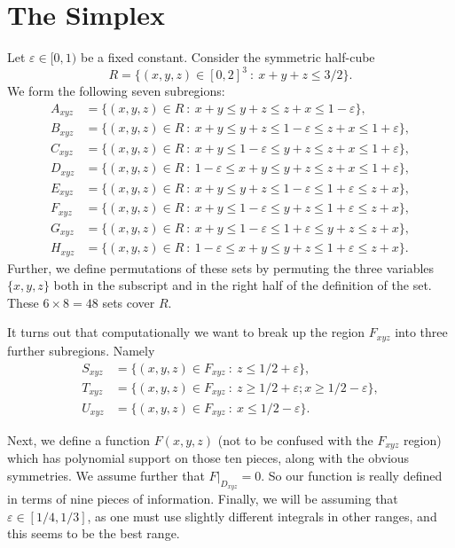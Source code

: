 \documentclass[12pt]{amsart}
\numberwithin{equation}{section}
\theoremstyle{plain}
\theoremstyle{definition}
\begin{document}
\section{The Simplex}

Let $\varepsilon\in [0,1)$ be a fixed constant.  Consider the symmetric half-cube
\[
R=\{(x,y,z)\in [0,2]^{3}\ :\ x+y+z\leq 3/2\}.
\]
We form the following seven subregions:
\begin{align*}
A_{xyz} & =\{(x,y,z)\in R\ :\ x+y\leq y+z\leq z+x\leq 1-\varepsilon\},\\
B_{xyz} & =\{(x,y,z)\in R\ :\ x+y\leq y+z\leq 1-\varepsilon\leq z+x\leq 1+\varepsilon\},\\
C_{xyz} & =\{(x,y,z)\in R\ :\ x+y\leq 1-\varepsilon \leq y+z \leq z+x\leq 1+\varepsilon\},\\
D_{xyz} & =\{(x,y,z)\in R\ :\ 1-\varepsilon \leq x+y\leq  y+z \leq z+x\leq 1+\varepsilon\},\\
E_{xyz} & =\{(x,y,z)\in R\ :\ x+y\leq y+z\leq 1-\varepsilon \leq  1+\varepsilon \leq z+x\},\\
F_{xyz} & =\{(x,y,z)\in R\ :\ x+y\leq 1-\varepsilon \leq y+z \leq  1+\varepsilon \leq z+x\},\\
G_{xyz} & =\{(x,y,z)\in R\ :\ x+y\leq 1-\varepsilon  \leq  1+\varepsilon \leq y+z \leq z+x\},\\
H_{xyz} & =\{(x,y,z)\in R\ :\ 1-\varepsilon \leq x+y\leq  y+z \leq 1+\varepsilon \leq z+x\}.
\end{align*}
Further, we define permutations of these sets by permuting the three variables $\{x,y,z\}$ both in the subscript and in the right half of the definition of the set.  These $6\times 8=48$ sets cover $R$.

It turns out that computationally we want to break up the region $F_{xyz}$ into three further subregions.  Namely
\begin{align*}
S_{xyz} & = \{(x,y,z)\in F_{xyz}\ :\ z\leq 1/2+\varepsilon\},\\
T_{xyz} & = \{(x,y,z)\in F_{xyz}\ :\ z\geq 1/2+\varepsilon;x\geq 1/2-\varepsilon \}, \\
U_{xyz} & = \{(x,y,z)\in F_{xyz}\ :\ x\leq 1/2-\varepsilon \}.
\end{align*}

Next, we define a function $F(x,y,z)$ (not to be confused with the $F_{xyz}$ region) which has polynomial support on those ten pieces, along with the obvious symmetries.  We assume further that $F|_{D_{xyz}}=0$.  So our function is really defined in terms of nine pieces of information.  Finally, we will be assuming that $\varepsilon\in [1/4,1/3]$, as one must use slightly different integrals in other ranges, and this seems to be the best range.
\end{document}
